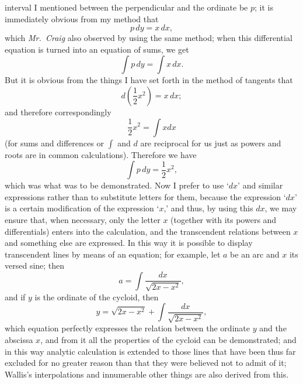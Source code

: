 \documentclass[polutonikogreek,english,twoside,openright]{article}
\begin{document}
interval I mentioned between the perpendicular and the ordinate be $p$; it is
immediately obvious from my method that 
$$p\,dy = x\,dx,$$
which   {\em
Mr.\ Craig} also observed by using the same method; when this differential
equation is turned into an equation of sums, we get 
$$\int\!p\,dy = \int\!x\,dx.$$
 But  it is obvious from the things I have set forth in the method
of tangents that 
$$d\left(\frac{1}{2}x^2\right) = x\,dx;$$
 and therefore correspondingly
$$\frac{1}{2}x^2 = \int\!xdx$$ 
(for sums and differences or $\int$ and $d$ are reciprocal for us just
as powers and roots are in common calculations). Therefore we have
$$\int\!p\,dy = \frac{1}{2}x^2,$$
which was what was to be demonstrated.  Now I prefer to use `$dx$' and
similar expressions rather than to substitute letters for them,
because the expression `$dx$' is a certain modification of the
expression `$x$,' and thus, by using this $dx$, we may ensure that,
when necessary, only the letter $x$ (together with its powers and
differentials) enters into the calculation, and the transcendent
relations between $x$ and something else are expressed.  In this way
it is possible to display transcendent lines by means of an equation;
for example, let $a$ be an arc and $x$ its versed sine; then
 $$a = \int \!\frac{dx}{\sqrt{2x-x^2}},$$\label{lcircarc} \hspace{-.65em} and if $y$ is
the ordinate of the cycloid, then
 $$y = \sqrt{2x-x^2} +
 \int \!\frac{dx}{\sqrt{2x-x^2}},$$ which equation perfectly expresses
 the relation between the ordinate $y$ and the abscissa $x$, and from
 it all the properties of the cycloid can be demonstrated; and in this
 way analytic calculation is extended to those lines that have been
 thus far excluded for no greater reason than that they were believed
 not to admit of it; Wallis's interpolations and innumerable other
 things are also derived from this.
\end{document}
